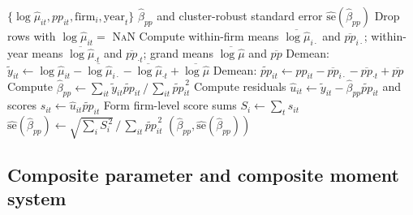 \documentclass[11pt]{article}
\begin{document}
\begin{algorithm}[htbp]
\caption{Stage C --- Causal regression with firm-year demeaning}\label{alg:stage_c}
\begin{algorithmic}[1]
\INPUT $\{\log\hat\mu_{it}, pp_{it}, \text{firm}_i, \text{year}_t\}$
\OUTPUT $\hat\beta_{pp}$ and cluster-robust standard error $\hat{\mathrm{se}}(\hat\beta_{pp})$
\State Drop rows with $\log\hat\mu_{it} = $ \textsc{NaN}
\State Compute within-firm means $\overline{\log\hat\mu}_{i\cdot}$ and $\overline{pp}_{i\cdot}$; within-year means $\overline{\log\hat\mu}_{\cdot t}$ and $\overline{pp}_{\cdot t}$; grand means $\overline{\log\hat\mu}$ and $\overline{pp}$
\State Demean: $\widetilde y_{it} \gets \log\hat\mu_{it} - \overline{\log\hat\mu}_{i\cdot} - \overline{\log\hat\mu}_{\cdot t} + \overline{\log\hat\mu}$
\State Demean: $\widetilde{pp}_{it} \gets pp_{it} - \overline{pp}_{i\cdot} - \overline{pp}_{\cdot t} + \overline{pp}$
\State Compute $\hat\beta_{pp} \gets \sum_{it} \widetilde y_{it}\widetilde{pp}_{it} \,\big/\, \sum_{it}\widetilde{pp}_{it}^{\,2}$
\State Compute residuals $\hat u_{it} \gets \widetilde y_{it} - \hat\beta_{pp}\widetilde{pp}_{it}$ and scores $s_{it} \gets \hat u_{it}\widetilde{pp}_{it}$
\State Form firm-level score sums $S_i \gets \sum_t s_{it}$
\State $\hat{\mathrm{se}}(\hat\beta_{pp}) \gets \sqrt{\sum_i S_i^{\,2}} \,\big/\, \sum_{it}\widetilde{pp}_{it}^{\,2}$ 
\State \Return $(\hat\beta_{pp}, \hat{\mathrm{se}}(\hat\beta_{pp}))$
\end{algorithmic}
\end{algorithm}

\subsection{Composite parameter and composite moment system}
\end{document}
